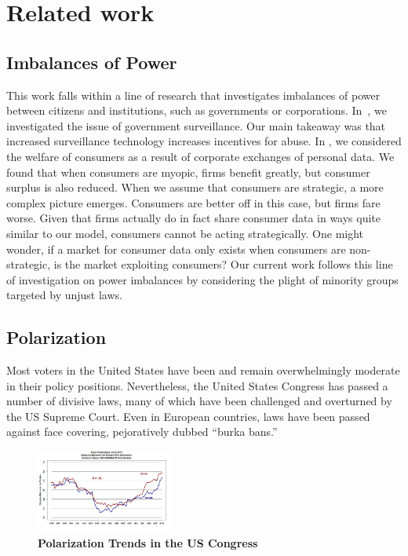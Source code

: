 
\section{Related work}
\label{sec:related}

\subsection{Imbalances of Power}
This work falls within a line of research that investigates imbalances of power between citizens and institutions, such as governments or corporations. In~\cite{laskowskigovernment}, we investigated the issue of government surveillance.  Our main takeaway was that increased surveillance technology increases incentives for abuse. In  \cite{johnsoncaviar}, we considered the welfare of consumers as a result of corporate exchanges of personal data.
We found that when consumers are myopic, firms benefit greatly, but consumer surplus is also reduced. When we assume that consumers are strategic, a more complex picture emerges. Consumers are better off in this case, but firms fare worse.  Given that firms actually do in fact share consumer data in ways quite similar to our model, consumers cannot be acting strategically.  One might wonder, if a market for consumer data only exists when consumers are non-strategic, is the market exploiting consumers?  Our current work follows this line of investigation on power imbalances by considering the plight of minority groups targeted by unjust laws.

\subsection{Polarization}
Most voters in the United States have been and remain overwhelmingly moderate in their policy positions\cite{layman2006party}. Nevertheless, the United States Congress has passed a number of divisive laws, many of which have been challenged and overturned by the US Supreme Court.  Even in European countries, laws have been passed %
against face covering, pejoratively dubbed ``burka bans.''

\begin{figure}[htbp]
\begin{center}
\includegraphics[width=0.4\textwidth]{figs/polar_house_and_senate_46-115_july_11}
\caption{{\bf Polarization Trends in the US Congress}}
\label{fig:uscongress}
\end{center}
\end{figure}

